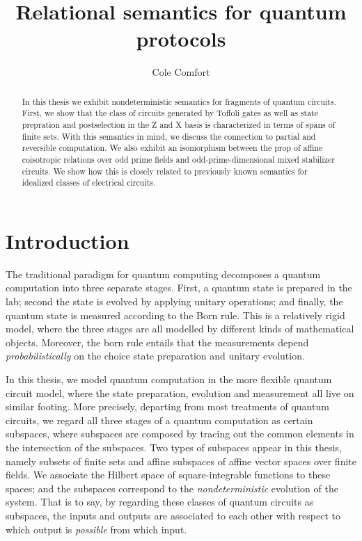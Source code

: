 \documentclass[12pt]{ociamthesis}  %
\title{Relational semantics for quantum protocols}
\author{Cole Comfort}
\begin{document}
\maketitle


\begin{abstract}
In this thesis we exhibit nondeterministic semantics for fragments of quantum circuits.  First, we show that the class of circuits generated by Toffoli gates as well as state prepration and postselection in the Z and X basis is characterized in terms of spans of finite sets. With this semantics in mind, we discuss the connection to partial and reversible computation. We also exhibit an isomorphism between the prop of affine coisotropic relations over odd prime fields and odd-prime-dimensional mixed stabilizer circuits.   We show how this is closely related to previously known semantics for idealized classes of electrical circuits.  
\end{abstract}


\tableofcontents


\chapter{Introduction}
\label{chap:intro}


The traditional paradigm for quantum computing decomposes a quantum computation into three separate stages. First, a quantum state is prepared in the lab; second the state is evolved by applying unitary operations; and finally, the quantum state is measured according to the Born rule.  This is a relatively rigid model, where the three stages are all modelled by different kinds of mathematical objects.  Moreover, the born rule entails that the measurements depend {\em probabilistically} on the choice state preparation and unitary evolution.

In this thesis, we model quantum computation in the more flexible quantum circuit model, where the state preparation, evolution and measurement all live on similar footing.  More precisely, departing from most treatments of quantum circuits, we regard all three stages of a quantum computation as certain subspaces, where subspaces are composed by tracing out the common elements in the intersection of the subspaces.  Two types of subspaces appear in this thesis, namely subsets of finite sets and affine subspaces of affine vector spaces over finite fields.  We associate the Hilbert space of square-integrable functions to these spaces; and the subspaces correspond to the {\em nondeterministic} evolution of the system.  That is to say, by regarding these classes of quantum circuits as subspaces, the inputs and outputs are associated to each other with respect to which output is {\em possible} from which input.
\end{document}
